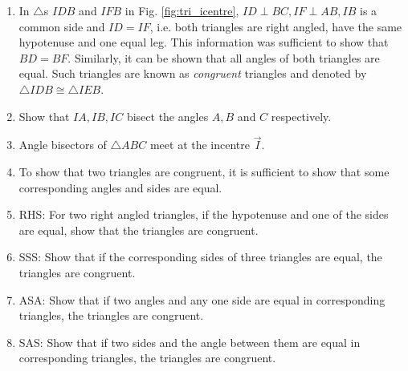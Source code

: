 \renewcommand{\theequation}{\theenumi}
\begin{enumerate}[label=\arabic*.,ref=\thesubsection.\theenumi]

\item In $\triangle$s $IDB$ and $IFB$ in  Fig. \ref{fig:tri_icentre},  $ID\perp BC, IF\perp AB, IB$ is a common side and $ID = IF$, i.e. both triangles are right angled, have the same hypotenuse and one equal leg.  This information was sufficient to show that $BD = BF$.  Similarly, it can be shown that all angles of both triangles are equal.  Such triangles are known as {\em congruent} triangles and denoted by $\triangle IDB \cong \triangle IEB$.
\item Show that $IA, IB, IC$ bisect the angles $A, B$ and $C$ respectively.  
\item Angle bisectors of $\triangle ABC$ meet at the incentre $\vec{I}$.

\item
To show that two triangles are congruent, it is sufficient to show that some corresponding angles and sides are equal.  

\item
RHS:	For two right angled triangles, if the hypotenuse and one of the sides are equal, show that the triangles are congruent.


\item
SSS:	Show that if the corresponding sides of three triangles are equal, the triangles are congruent.

\item
ASA:	Show that if two angles and any one side  are equal in corresponding triangles, the triangles are congruent.

\item
SAS:	Show that if two sides and the angle between them are equal in corresponding triangles, the triangles are congruent.%

\end{enumerate}

